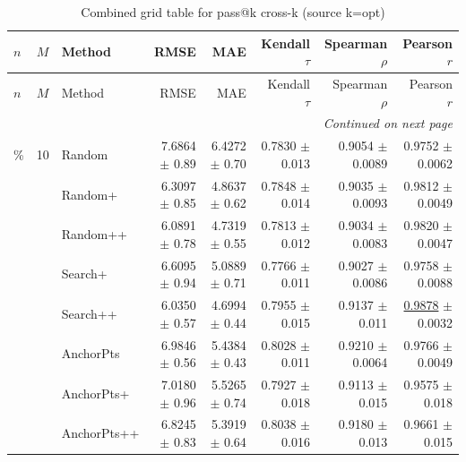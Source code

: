 \footnotesize
\setlength{\tabcolsep}{2pt}
\renewcommand{\arraystretch}{1.05}
\setlength{\LTpre}{0pt}
\setlength{\LTpost}{0pt}
\setlength{\LTleft}{\fill}
\setlength{\LTright}{\fill}
\begin{longtable}{llp{}rrrrr}
\caption{Combined grid table for pass@k cross-k (source k=opt)}\label{tab:combined\_grid\_passk\_kopt}\\
\toprule
$n$ & $M$ & Method & RMSE & MAE & Kendall $\tau$ & Spearman $\rho$ & Pearson $r$ \\
\midrule
\endfirsthead
\toprule
$n$ & $M$ & Method & RMSE & MAE & Kendall $\tau$ & Spearman $\rho$ & Pearson $r$ \\
\midrule
\endhead
\midrule
\multicolumn{8}{r}{\emph{Continued on next page}} \\
\midrule
\endfoot
\bottomrule
\endlastfoot
5\% & 10 & Random & 7.6864 {\scriptsize $\pm$ 0.89} & 6.4272 {\scriptsize $\pm$ 0.70} & 0.7830 {\scriptsize $\pm$ 0.013} & 0.9054 {\scriptsize $\pm$ 0.0089} & 0.9752 {\scriptsize $\pm$ 0.0062} \\
 &  & Random+ & 6.3097 {\scriptsize $\pm$ 0.85} & 4.8637 {\scriptsize $\pm$ 0.62} & 0.7848 {\scriptsize $\pm$ 0.014} & 0.9035 {\scriptsize $\pm$ 0.0093} & 0.9812 {\scriptsize $\pm$ 0.0049} \\
 &  & Random++ & 6.0891 {\scriptsize $\pm$ 0.78} & 4.7319 {\scriptsize $\pm$ 0.55} & 0.7813 {\scriptsize $\pm$ 0.012} & 0.9034 {\scriptsize $\pm$ 0.0083} & 0.9820 {\scriptsize $\pm$ 0.0047} \\
 &  & Search+ & 6.6095 {\scriptsize $\pm$ 0.94} & 5.0889 {\scriptsize $\pm$ 0.71} & 0.7766 {\scriptsize $\pm$ 0.011} & 0.9027 {\scriptsize $\pm$ 0.0086} & 0.9758 {\scriptsize $\pm$ 0.0088} \\
 &  & Search++ & 6.0350 {\scriptsize $\pm$ 0.57} & 4.6994 {\scriptsize $\pm$ 0.44} & 0.7955 {\scriptsize $\pm$ 0.015} & 0.9137 {\scriptsize $\pm$ 0.011} & \underline{0.9878} {\scriptsize $\pm$ 0.0032} \\
 &  & AnchorPts & 6.9846 {\scriptsize $\pm$ 0.56} & 5.4384 {\scriptsize $\pm$ 0.43} & 0.8028 {\scriptsize $\pm$ 0.011} & 0.9210 {\scriptsize $\pm$ 0.0064} & 0.9766 {\scriptsize $\pm$ 0.0049} \\
 &  & AnchorPts+ & 7.0180 {\scriptsize $\pm$ 0.96} & 5.5265 {\scriptsize $\pm$ 0.74} & 0.7927 {\scriptsize $\pm$ 0.018} & 0.9113 {\scriptsize $\pm$ 0.015} & 0.9575 {\scriptsize $\pm$ 0.018} \\
 &  & AnchorPts++ & 6.8245 {\scriptsize $\pm$ 0.83} & 5.3919 {\scriptsize $\pm$ 0.64} & 0.8038 {\scriptsize $\pm$ 0.016} & 0.9180 {\scriptsize $\pm$ 0.013} & 0.9661 {\scriptsize $\pm$ 0.015} \\

\end{longtable}
